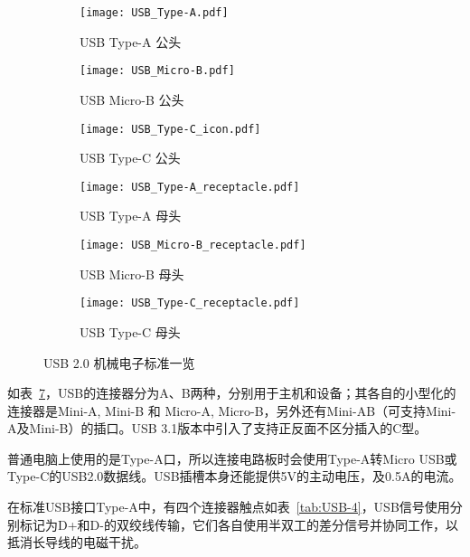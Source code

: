 \begin{figure}[htbp]
    \centering %
    \begin{subfigure}{0.25\textwidth}
    \texttt{[image: USB\_Type-A.pdf]}
    \caption{USB Type-A 公头}
    \label{fig:USB-1}
    \end{subfigure}\hfil %
    \begin{subfigure}{0.25\textwidth}
    \texttt{[image: USB\_Micro-B.pdf]}
    \caption{USB Micro-B 公头}
    \label{fig:USB-2}
    \end{subfigure}\hfil %
    \begin{subfigure}{0.25\textwidth}
    \texttt{[image: USB\_Type-C\_icon.pdf]}
    \caption{USB Type-C 公头}
    \label{fig:USB-3}
    \end{subfigure}

    \medskip
    \begin{subfigure}{0.25\textwidth}
    \texttt{[image: USB\_Type-A\_receptacle.pdf]}
    \caption{USB Type-A 母头}
    \label{fig:USB-4}
    \end{subfigure}\hfil %
    \begin{subfigure}{0.25\textwidth}
    \texttt{[image: USB\_Micro-B\_receptacle.pdf]}
    \caption{USB Micro-B 母头}
    \label{fig:USB-5}
    \end{subfigure}\hfil %
    \begin{subfigure}{0.25\textwidth}
    \texttt{[image: USB\_Type-C\_receptacle.pdf]}
    \caption{USB Type-C 母头}
    \label{fig:USB-6}
    \end{subfigure}
    \caption{USB 2.0 机械电子标准一览}
    \label{fig:USB-M}
\end{figure}


如表~\ref{fig:USB-M}，USB的连接器分为A、B两种，分别用于主机和设备；其各自的小型化的连接器是Mini-A, Mini-B 和 Micro-A, Micro-B，另外还有Mini-AB（可支持Mini-A及Mini-B）的插口。USB 3.1版本中引入了支持正反面不区分插入的C型。

普通电脑上使用的是Type-A口，所以连接电路板时会使用Type-A转Micro USB或Type-C的USB2.0数据线。USB插槽本身还能提供5V的主动电压，及0.5A的电流。

在标准USB接口Type-A中，有四个连接器触点如表~\ref{tab:USB-4}，USB信号使用分别标记为D+和D-的双绞线传输，它们各自使用半双工的差分信号并协同工作，以抵消长导线的电磁干扰。

